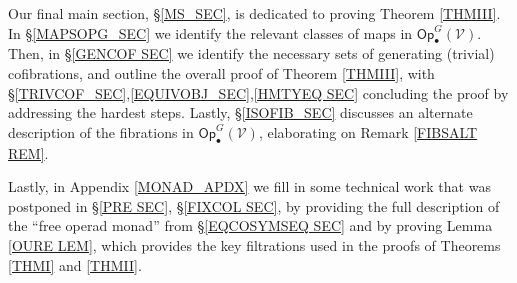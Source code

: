 \documentclass[a4paper,10pt
,draft
]{article}%
\numberwithin{equation}{section}
\numberwithin{figure}{section}
\theoremstyle{definition} %
\newtheorem{example}[equation]{Example}%
\newcommand{\Top}{\ensuremath{\mathsf{Top}}}
\newcommand{\V}{\ensuremath{\mathcal V}}
\newcommand{\1}{\ensuremath{\mathbbm 1}}%
\begin{document}
Our final main section, \S \ref{MS_SEC}, is dedicated to proving 
Theorem \ref{THMIII}.
In \S \ref{MAPSOPG_SEC} we identify the relevant classes of maps
in $\mathsf{Op}^G_{\bullet}(\V)$.
Then, in \S \ref{GENCOF SEC} we identify
the necessary sets of generating (trivial) cofibrations,
and outline the overall proof of Theorem \ref{THMIII},
with \S \ref{TRIVCOF_SEC},\ref{EQUIVOBJ_SEC},\ref{HMTYEQ SEC}
concluding the proof by addressing the hardest steps.
Lastly, \S \ref{ISOFIB_SEC} discusses an alternate description
of the fibrations in
$\mathsf{Op}^G_{\bullet}(\V)$,
elaborating on 
Remark \ref{FIBSALT REM}.




Lastly, in Appendix \ref{MONAD_APDX}
we fill in some technical work that was postponed in \S \ref{PRE SEC}, \S\ref{FIXCOL SEC},
by providing the full description of the ``free operad monad''
from \S \ref{EQCOSYMSEQ SEC}
and by proving Lemma \ref{OURE LEM},
which provides the key filtrations used in the proofs of
Theorems \ref{THMI} and \ref{THMII}.
 

\end{document}
